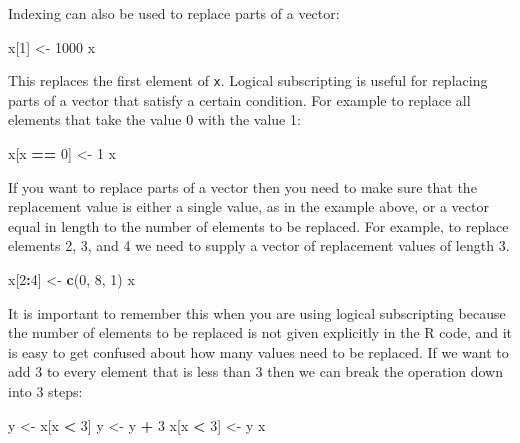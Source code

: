 \documentclass[
]{book}
\newenvironment{Shaded}{\begin{snugshade}}{\end{snugshade}}
\newcommand{\DecValTok}[1]{\textcolor[rgb]{0.00,0.00,0.81}{#1}}
\newcommand{\FunctionTok}[1]{\textcolor[rgb]{0.13,0.29,0.53}{\textbf{#1}}}
\newcommand{\NormalTok}[1]{#1}
\newcommand{\OtherTok}[1]{\textcolor[rgb]{0.56,0.35,0.01}{#1}}
\newcommand{\SpecialCharTok}[1]{\textcolor[rgb]{0.81,0.36,0.00}{\textbf{#1}}}
\begin{document}
Indexing can also be used to replace parts of a vector:

\begin{Shaded}
\begin{Highlighting}[]
\NormalTok{x[}\DecValTok{1}\NormalTok{] }\OtherTok{\textless{}{-}} \DecValTok{1000}
\NormalTok{x}
\end{Highlighting}
\end{Shaded}

This replaces the first element of \texttt{x}. Logical subscripting is
useful for replacing parts of a vector that satisfy a certain condition.
For example to replace all elements that take the value 0 with the value 1:

\begin{Shaded}
\begin{Highlighting}[]
\NormalTok{x[x }\SpecialCharTok{==} \DecValTok{0}\NormalTok{] }\OtherTok{\textless{}{-}} \DecValTok{1}
\NormalTok{x}
\end{Highlighting}
\end{Shaded}

If you want to replace parts of a vector then you need to make sure
that the replacement value is either a single value, as in the example
above, or a vector equal in length to the number of elements to be
replaced. For example, to replace elements 2, 3, and 4 we need to
supply a vector of replacement values of length 3.

\begin{Shaded}
\begin{Highlighting}[]
\NormalTok{x[}\DecValTok{2}\SpecialCharTok{:}\DecValTok{4}\NormalTok{] }\OtherTok{\textless{}{-}} \FunctionTok{c}\NormalTok{(}\DecValTok{0}\NormalTok{, }\DecValTok{8}\NormalTok{, }\DecValTok{1}\NormalTok{)}
\NormalTok{x}
\end{Highlighting}
\end{Shaded}

It is important to remember this when you are using logical
subscripting because the number of elements to be replaced is not
given explicitly in the R code, and it is easy to get confused about
how many values need to be replaced. If we want to add 3 to every
element that is less than 3 then we can break the operation down into
3 steps:

\begin{Shaded}
\begin{Highlighting}[]
\NormalTok{y }\OtherTok{\textless{}{-}}\NormalTok{ x[x }\SpecialCharTok{\textless{}} \DecValTok{3}\NormalTok{]}
\NormalTok{y }\OtherTok{\textless{}{-}}\NormalTok{ y }\SpecialCharTok{+} \DecValTok{3}
\NormalTok{x[x }\SpecialCharTok{\textless{}} \DecValTok{3}\NormalTok{] }\OtherTok{\textless{}{-}}\NormalTok{ y}
\NormalTok{x}
\end{Highlighting}
\end{Shaded}
\end{document}
